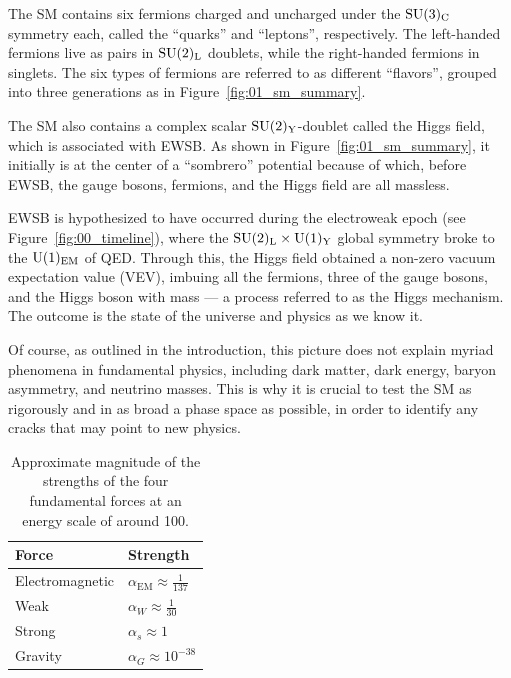 The SM contains six fermions charged and uncharged under the $\SU[3]_\mathrm{C}$ symmetry each, called the ``quarks'' and ``leptons'', respectively.
The left-handed fermions live as pairs in $\SU[2]_\mathrm{L}$ doublets, while the right-handed fermions in singlets.
The six types of fermions are referred to as different ``flavors'', grouped into three generations as in Figure~\ref{fig:01_sm_summary}.

The SM also contains a complex scalar $\SU[2]_\mathrm{Y}$-doublet called the Higgs field, which is associated with EWSB.
As shown in Figure~\ref{fig:01_sm_summary}, it initially is at the center of a ``sombrero'' potential because of which, before EWSB, the gauge bosons, fermions, and the Higgs field are all massless.

EWSB is hypothesized to have occurred during the electroweak epoch (see Figure~\ref{fig:00_timeline}), where the $\SU[2]_\mathrm{L} \times \UU[1]_\mathrm{Y}$ global symmetry broke to the $\UU[1]_\mathrm{EM}$ of QED.
Through this, the Higgs field obtained a non-zero vacuum expectation value (VEV), imbuing all the fermions, three of the gauge bosons, and the Higgs boson with mass --- a process referred to as the Higgs mechanism.
The outcome is the state of the universe and physics as we know it.

Of course, as outlined in the introduction, this picture does not explain myriad phenomena in fundamental physics, including dark matter, dark energy, baryon asymmetry, and neutrino masses.
This is why it is crucial to test the SM as rigorously and in as broad a phase space as possible, in order to identify any cracks that may point to new physics.


\begin{table}[htbp]
    \centering
	\caption{Approximate magnitude of the strengths of the four fundamental forces at an energy scale of around 100\MeV.}
	\renewcommand{\arraystretch}{1.5}
    \begin{tabular}{ll}
        \toprule
        \textbf{Force} & \textbf{Strength}\\
        \midrule
        Electromagnetic &
        $\alpha_\mathrm{EM} \approx \frac{1}{137}$ \\
        Weak &
        $\alpha_W \approx \frac{1}{30}$\\
        Strong &
        $\alpha_s \approx 1$\\
        Gravity &
        $\alpha_G  \approx 10^{-38}$\\
        \bottomrule
    \end{tabular}
	\label{tab:01_sm_coupling_constants}
\end{table}


